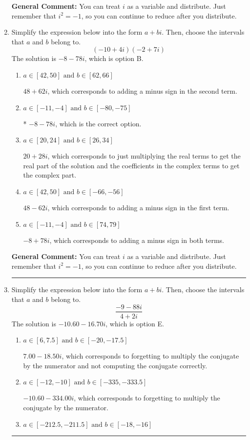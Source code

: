 \documentclass{extbook}[14pt]
\newcommand{\litem}[1]{\item #1

\rule{\textwidth}{0.4pt}}
\begin{document}
\begin{enumerate}
{\textbf{General Comment:} You can treat $i$ as a variable and distribute. Just remember that $i^2=-1$, so you can continue to reduce after you distribute.
}
\litem{
Simplify the expression below into the form $a+bi$. Then, choose the intervals that $a$ and $b$ belong to.
\[ (-10 + 4 i)(-2 + 7 i) \]
The solution is \( -8 - 78 i \), which is option B.\begin{enumerate}[label=\Alph*.]
\item \( a \in [42, 50] \text{ and } b \in [62, 66] \)

 $48 + 62 i$, which corresponds to adding a minus sign in the second term.
\item \( a \in [-11, -4] \text{ and } b \in [-80, -75] \)

* $-8 - 78 i$, which is the correct option.
\item \( a \in [20, 24] \text{ and } b \in [26, 34] \)

 $20 + 28 i$, which corresponds to just multiplying the real terms to get the real part of the solution and the coefficients in the complex terms to get the complex part.
\item \( a \in [42, 50] \text{ and } b \in [-66, -56] \)

 $48 - 62 i$, which corresponds to adding a minus sign in the first term.
\item \( a \in [-11, -4] \text{ and } b \in [74, 79] \)

 $-8 + 78 i$, which corresponds to adding a minus sign in both terms.
\end{enumerate}

\textbf{General Comment:} You can treat $i$ as a variable and distribute. Just remember that $i^2=-1$, so you can continue to reduce after you distribute.
}
\litem{
Simplify the expression below into the form $a+bi$. Then, choose the intervals that $a$ and $b$ belong to.
\[ \frac{-9 - 88 i}{4 + 2 i} \]
The solution is \( -10.60  - 16.70 i \), which is option E.\begin{enumerate}[label=\Alph*.]
\item \( a \in [6, 7.5] \text{ and } b \in [-20, -17.5] \)

 $7.00  - 18.50 i$, which corresponds to forgetting to multiply the conjugate by the numerator and not computing the conjugate correctly.
\item \( a \in [-12, -10] \text{ and } b \in [-335, -333.5] \)

 $-10.60  - 334.00 i$, which corresponds to forgetting to multiply the conjugate by the numerator.
\item \( a \in [-212.5, -211.5] \text{ and } b \in [-18, -16] \)


\end{enumerate}}
\end{enumerate}
\end{document}
